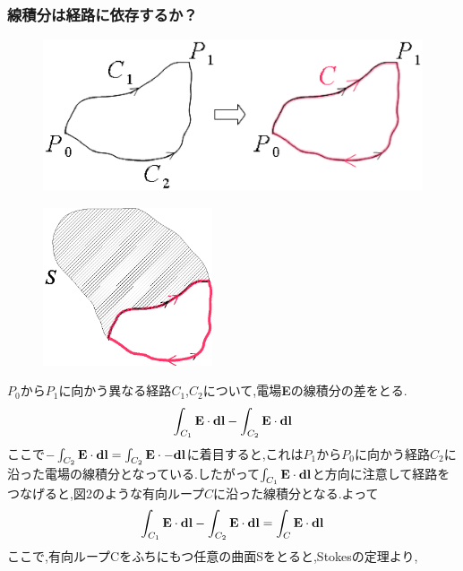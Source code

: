 \documentclass{jsarticle}
\begin{document}
\subsubsection{線積分は経路に依存するか？}
\begin{figure}[htbp]
 \begin{center}
  \includegraphics[width=150mm]{5.2.eps}
 \end{center}
 \caption{}
 \label{fig:two}
\end{figure}
\begin{figure}[htbp]
 \begin{center}
  \includegraphics[width=50mm]{5.3.eps}
 \end{center}
 \caption{}
 \label{fig:three}
\end{figure}
$P_0$から$P_1$に向かう異なる経路$C_1$,$C_2$について,電場{\bf E}の線積分の差をとる.
\begin{eqnarray}
\int_{C_1}^{} {\bf E} \cdot {\bf dl} - \int_{C_2}^{} {\bf E} \cdot {\bf dl}
\end{eqnarray}
ここで$- \int_{C_2}^{} {\bf E} \cdot {\bf dl}=\int_{C_2}^{} {\bf E} \cdot {-\bf dl}$に着目すると,これは$P_1$から$P_0$に向かう経路$C_2$に沿った電場の線積分となっている.したがって$\int_{C_1}^{} {\bf E} \cdot {\bf dl}$と方向に注意して経路をつなげると,図2のような有向ループ$C$に沿った線積分となる.よって
\begin{eqnarray}
\int_{C_1}^{} {\bf E} \cdot {\bf dl} - \int_{C_2}^{} {\bf E} \cdot {\bf dl} = \int_{C}^{} {\bf E} \cdot {\bf dl}
\end{eqnarray}
ここで,有向ループCをふちにもつ任意の曲面Sをとると,Stokesの定理より,
\end{document}

